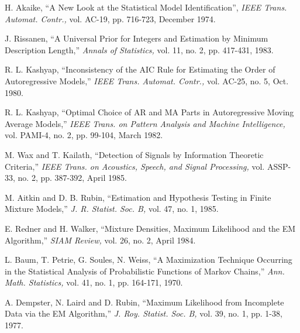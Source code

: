 \documentclass[12pt]{article}
\begin{document}
\begin{thebibliography}{99}




H. Akaike, ``A New Look at the Statistical Model Identification'',
{\em IEEE Trans. Automat. Contr.,}
vol. AC-19, pp. 716-723, December 1974.

J. Rissanen,
``A Universal Prior for Integers and Estimation by Minimum
Description Length,''
{\em Annals of Statistics,}
vol. 11, no. 2, pp. 417-431, 1983.

R. L. Kashyap,
``Inconsistency of the AIC Rule for Estimating the Order of Autoregressive Models,''
{\em IEEE Trans. Automat. Contr.,}
vol. AC-25, no. 5, Oct. 1980.

R. L. Kashyap,
``Optimal Choice of AR and MA Parts in Autoregressive Moving Average Models,''
{\em IEEE Trans. on Pattern Analysis and Machine Intelligence,}
vol. PAMI-4, no. 2, pp. 99-104, March 1982.

M. Wax and T. Kailath,
``Detection of Signals by Information Theoretic Criteria,''
{\em IEEE Trans. on Acoustics, Speech, and Signal Processing,}
vol. ASSP-33, no. 2, pp. 387-392, April 1985.

M. Aitkin and D. B. Rubin,
``Estimation and Hypothesis Testing in Finite Mixture Models,''
{\em J. R. Statist. Soc. B,} vol. 47, no. 1, 1985.

E. Redner and H. Walker, ``Mixture Densities, Maximum Likelihood and
the EM Algorithm,'' {\em SIAM Review,} vol. 26, no. 2, April 1984.

L. Baum, T. Petrie, G. Soules, N. Weiss,
``A Maximization Technique Occurring in the Statistical Analysis
of Probabilistic Functions of Markov Chains,''
{\em Ann. Math. Statistics,} vol. 41, no. 1, pp. 164-171, 1970.

A. Dempster, N. Laird and D. Rubin,
``Maximum Likelihood from Incomplete Data via the EM Algorithm,''
{\em J. Roy. Statist. Soc. B,} vol. 39, no. 1, pp. 1-38, 1977.


\end{thebibliography}
\end{document}
